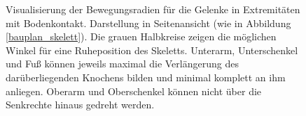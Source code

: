 \begin{figure}
  
  \caption{Visualisierung der Bewegungsradien für die Gelenke in Extremitäten mit Bodenkontakt. Darstellung in Seitenansicht (wie in Abbildung \ref{bauplan_skelett}). Die grauen Halbkreise zeigen die möglichen Winkel für eine Ruheposition des Skeletts. Unterarm, Unterschenkel und Fuß können jeweils maximal die Verlängerung des darüberliegenden Knochens bilden und minimal komplett an ihm anliegen. Oberarm und Oberschenkel können nicht über die Senkrechte hinaus gedreht werden.}
  \label{joints}
 \end{figure}



